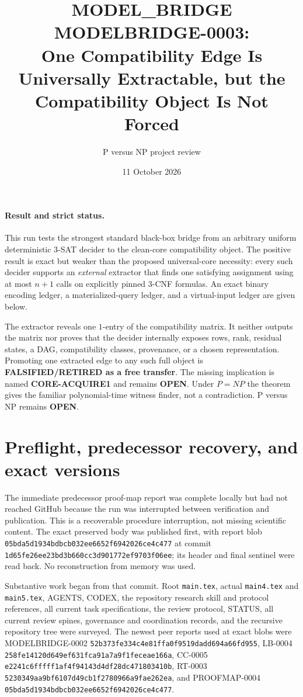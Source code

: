\documentclass[11pt]{article}
\title{MODEL\_BRIDGE MODELBRIDGE-0003:\\
One Compatibility Edge Is Universally Extractable, but the Compatibility Object Is Not Forced}
\author{P versus NP project review}
\date{11 October 2026}
\begin{document}
\maketitle

\paragraph{Result and strict status.}
This run tests the strongest standard black-box bridge from an arbitrary
uniform deterministic 3-SAT decider to the clean-core compatibility object.
The positive result is exact but weaker than the proposed universal-core
necessity: every such decider supports an \emph{external} extractor that
finds one satisfying assignment using at most $n+1$ calls on explicitly
pinned 3-CNF formulas.  An exact binary encoding ledger, a materialized-query
ledger, and a virtual-input ledger are given below.

The extractor reveals one $1$-entry of the compatibility matrix.  It neither
outputs the matrix nor proves that the decider internally exposes rows,
rank, residual states, a DAG, compatibility classes, provenance, or a chosen
representation.  Promoting one extracted edge to any such full object is
\textbf{FALSIFIED/RETIRED as a free transfer}.  The missing implication is
named \textbf{CORE-ACQUIRE1} and remains \textbf{OPEN}.  Under $P=NP$ the
theorem gives the familiar polynomial-time witness finder, not a
contradiction.  P versus NP remains \textbf{OPEN}.

\section{Preflight, predecessor recovery, and exact versions}
The immediate predecessor proof-map report was complete locally but had not
reached GitHub because the run was interrupted between verification and
publication.  This is a recoverable procedure interruption, not missing
scientific content.  The exact preserved body was published first, with
report blob \texttt{05bda5d1934bdbcb032ee6652f6942026ce4c477} at commit
\texttt{1d65fe26ee23bd3b660cc3d901772ef9703f06ee}; its header and final
sentinel were read back.  No reconstruction from memory was used.

Substantive work began from that commit.  Root \texttt{main.tex}, actual
\texttt{main4.tex} and \texttt{main5.tex}, AGENTS, CODEX, the repository
research skill and protocol references, all current task specifications,
the review protocol, STATUS, all current review spines, governance and
coordination records, and the recursive repository tree were surveyed.
The newest peer reports used at exact blobs were MODELBRIDGE-0002
\texttt{52b373fe334c4e81ffa0f9519dadd694a66fd955}, LB-0004
\texttt{258fe14120d649ef631fca91a7a9f1feceae166a}, CC-0005
\texttt{e2241c6fffff1af4f94143d4df28dc471803410b}, RT-0003
\texttt{5230349aa9bf6107d49cb1f2780966a9fae262ea}, and PROOFMAP-0004
\texttt{05bda5d1934bdbcb032ee6652f6942026ce4c477}.
\end{document}

